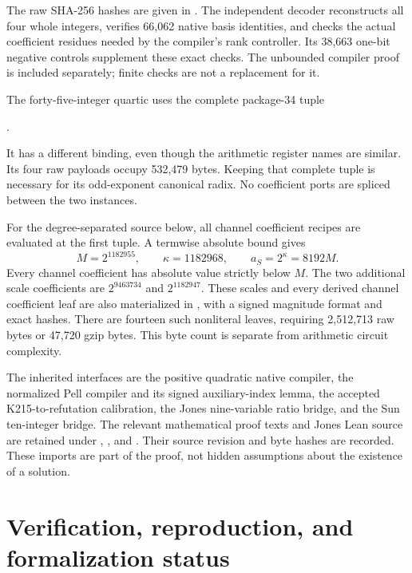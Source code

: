 \documentclass[11pt,a4paper]{article}
\theoremstyle{definition}
\begin{document}
The raw SHA-256 hashes are given in .
The independent decoder reconstructs all four whole integers, verifies
66,062 native basis identities, and checks the actual coefficient residues
needed by the compiler's rank controller.  Its 38,663 one-bit negative
controls supplement these exact checks.  The unbounded compiler proof is
included separately; finite checks are not a replacement for it.

The forty-five-integer quartic uses the complete package-34 tuple
\begin{center}.\end{center}
It has a different binding, even
though the arithmetic register names are similar.  Its four raw payloads
occupy 532,479 bytes.  Keeping that complete tuple is necessary for its
odd-exponent canonical radix.  No coefficient ports are spliced between
the two instances.

For the degree-separated source below, all channel coefficient recipes
are evaluated at the first tuple.  A termwise absolute bound gives
\[
 M=2^{1182955},\qquad \kappa=1182968,
 \qquad a_S=2^\kappa=8192M.
\]
Every channel coefficient has absolute value strictly below \(M\).
The two additional scale coefficients are
\(2^{9463734}\) and \(2^{1182947}\).  These scales and every derived
channel coefficient leaf are also materialized in , with
a signed magnitude format and exact hashes.  There are fourteen such
nonliteral leaves, requiring 2,512,713 raw bytes or 47,720 gzip bytes.
This byte count is separate from arithmetic circuit complexity.

The inherited interfaces are the positive quadratic native compiler,
the normalized Pell compiler and its signed auxiliary-index lemma,
the accepted K215-to-refutation calibration, the Jones nine-variable
ratio bridge, and the Sun ten-integer bridge.  The relevant mathematical
proof texts and Jones Lean source are retained under ,
, and .  Their source
revision and byte hashes are recorded.  These imports are part of the
proof, not hidden assumptions about the existence of a solution.







\section{Verification, reproduction, and formalization status}
\label{sec:status}
\end{document}
